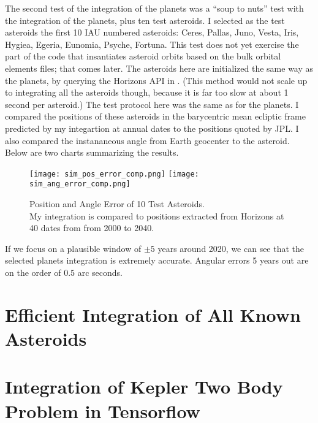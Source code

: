 The second test of the integration of the planets was a ``soup to nuts'' test with the integration of the planets, plus ten test asteroids.
I selected as the test asteroids the first 10 IAU numbered asteroids: Ceres, Pallas, Juno, Vesta, Iris, Hygiea, Egeria, Eunomia, Psyche, Fortuna.
This test does not yet exercise the part of the code that insantiates asteroid orbits based on the bulk orbital elements files; that comes later.
The asteroids here are initialized the same way as the planets, by querying the Horizons API in .
(This method would not scale up to integrating all the asteroids though, because it is far too slow at about 1 second per asteroid.)
The test protocol here was the same as for the planets.
I compared the positions of these asteroids in the barycentric mean ecliptic frame predicted by my integartion at annual dates to the positions quoted by JPL.
I also compared the instananeous angle from Earth geocenter to the asteroid. \\
Below are two charts summarizing the results.
\begin{figure}
\begin{center}
\texttt{[image: sim\_pos\_error\_comp.png]}
\texttt{[image: sim\_ang\_error\_comp.png]}
\caption{Position and Angle Error of 10 Test Asteroids. \\
My integration is compared to positions extracted from Horizons at 40 dates from from 2000 to 2040.}
\end{center}
\end{figure}
If we focus on a plausible window of $\pm 5$ years around 2020, we can see that the selected planets integration is extremely accurate.
Angular errors 5 years out are on the order of $0.5$ arc seconds.

\section{Efficient Integration of All Known Asteroids}
\label{section_integrate_known_asteroids}

\section{Integration of Kepler Two Body Problem in Tensorflow}
\label{section_kepler_two_body_tensorflow}
